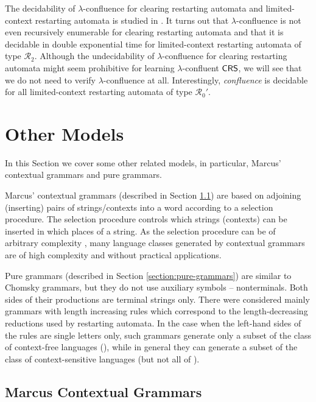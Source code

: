 The decidability of $\lambda$-confluence for clearing restarting automata and limited-context restarting automata is studied in \cite{OM15}. It turns out that $\lambda$-confluence is not even recursively enumerable for clearing restarting automata and that it is decidable in double exponential time for limited-context restarting automata of type $\mathcal{R}_2$. Although the undecidability of $\lambda$-confluence for clearing restarting automata might seem prohibitive for learning $\lambda$-confluent $\textup{\sf CRS\/}$, we will see that we do not need to verify $\lambda$-confluence at all. Interestingly, \emph{confluence} is decidable for all limited-context restarting automata of type $\mathcal{R}_0'$. 

\section{Other Models}
\label{section:other-models}

In this Section we cover some other related models, in particular, Marcus' contextual grammars and pure grammars.

Marcus' contextual grammars (described in Section \ref{section:marcus-contextual-grammars}) are based on adjoining (inserting) pairs of strings/contexts into a word according to a selection procedure. The selection procedure controls which strings (contexts) can be inserted in which places of a string. As the selection procedure can be of arbitrary complexity \cite{Pa98}, many language classes generated by contextual grammars are of high complexity and without practical applications.

Pure grammars \cite{maurer1980pure} (described in Section \ref{section:pure-grammars}) are similar to Chomsky grammars, but they do not use auxiliary symbols -- nonterminals. Both sides of their productions are terminal strings only. There were considered mainly grammars with length increasing rules which correspond to the length-decreasing reductions used by restarting automata. In the case when the left-hand sides of the rules are single letters only, such grammars generate only a subset of the class of context-free languages (\CFL), while in general they can generate a subset of the class of context-sensitive languages (but not all of \CFL).

\subsection{Marcus Contextual Grammars}
\label{section:marcus-contextual-grammars}

